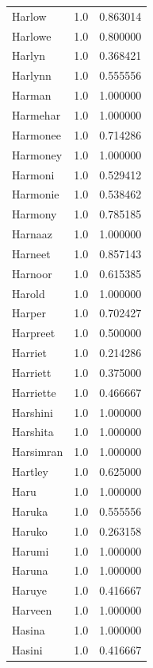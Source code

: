 \documentclass[
  letterpaper,
  DIV=11,
  numbers=noendperiod]{scrreprt}
\begin{document}
\begin{tabular}{lrr}
Harlow          &   1.0 &   0.863014 \\
Harlowe         &   1.0 &   0.800000 \\
Harlyn          &   1.0 &   0.368421 \\
Harlynn         &   1.0 &   0.555556 \\
Harman          &   1.0 &   1.000000 \\
Harmehar        &   1.0 &   1.000000 \\
Harmonee        &   1.0 &   0.714286 \\
Harmoney        &   1.0 &   1.000000 \\
Harmoni         &   1.0 &   0.529412 \\
Harmonie        &   1.0 &   0.538462 \\
Harmony         &   1.0 &   0.785185 \\
Harnaaz         &   1.0 &   1.000000 \\
Harneet         &   1.0 &   0.857143 \\
Harnoor         &   1.0 &   0.615385 \\
Harold          &   1.0 &   1.000000 \\
Harper          &   1.0 &   0.702427 \\
Harpreet        &   1.0 &   0.500000 \\
Harriet         &   1.0 &   0.214286 \\
Harriett        &   1.0 &   0.375000 \\
Harriette       &   1.0 &   0.466667 \\
Harshini        &   1.0 &   1.000000 \\
Harshita        &   1.0 &   1.000000 \\
Harsimran       &   1.0 &   1.000000 \\
Hartley         &   1.0 &   0.625000 \\
Haru            &   1.0 &   1.000000 \\
Haruka          &   1.0 &   0.555556 \\
Haruko          &   1.0 &   0.263158 \\
Harumi          &   1.0 &   1.000000 \\
Haruna          &   1.0 &   1.000000 \\
Haruye          &   1.0 &   0.416667 \\
Harveen         &   1.0 &   1.000000 \\
Hasina          &   1.0 &   1.000000 \\
Hasini          &   1.0 &   0.416667 \\

\end{tabular}
\end{document}
